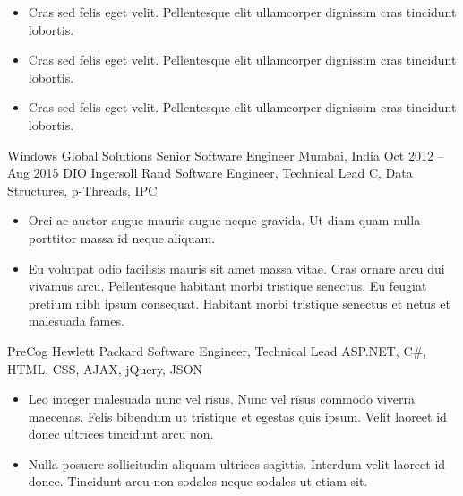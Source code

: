\documentclass[10pt, a4paper]{sivu}
\begin{document}
        \begin{itemize}
            \item Cras sed felis eget velit. Pellentesque elit ullamcorper dignissim cras tincidunt lobortis. \smallskip
            \item Cras sed felis eget velit. Pellentesque elit ullamcorper dignissim cras tincidunt lobortis. \smallskip
            \item Cras sed felis eget velit. Pellentesque elit ullamcorper dignissim cras tincidunt lobortis. \smallskip
        \end{itemize}

\smallskip
\divider
\smallskip

    \company
        {Windows Global Solutions}
        {Senior Software Engineer}
        {Mumbai, India}
        {Oct 2012 – Aug 2015}
        \project
        {DIO}
        {Ingersoll Rand}
        {Software Engineer, Technical Lead}
        {C, Data Structures, p-Threads, IPC}
        
        \begin{itemize}
            \item  Orci ac auctor augue mauris augue neque gravida. Ut diam quam nulla porttitor massa id neque aliquam.\smallskip
            \item Eu volutpat odio facilisis mauris sit amet massa vitae. Cras ornare arcu dui vivamus arcu. Pellentesque habitant morbi tristique senectus. Eu feugiat pretium nibh ipsum consequat. Habitant morbi tristique senectus et netus et malesuada fames.\smallskip
        \end{itemize}
        
        \dividergray
        
        \project
            {PreCog}
            {Hewlett Packard}
            {Software Engineer, Technical Lead}
            {ASP.NET, C\#, HTML, CSS, AJAX, jQuery, JSON}
        
        \begin{itemize}
            \item Leo integer malesuada nunc vel risus. Nunc vel risus commodo viverra maecenas. Felis bibendum ut tristique et egestas quis ipsum. Velit laoreet id donec ultrices tincidunt arcu non.\smallskip
            \item Nulla posuere sollicitudin aliquam ultrices sagittis. Interdum velit laoreet id donec. Tincidunt arcu non sodales neque sodales ut etiam sit.\smallskip
        \end{itemize}
        
\end{document}
